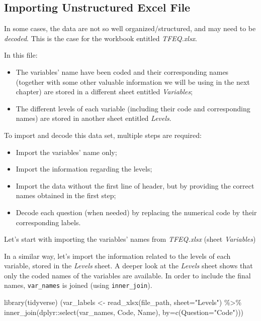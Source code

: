 \documentclass[
]{book}
\newenvironment{Shaded}{\begin{snugshade}}{\end{snugshade}}
\newcommand{\AttributeTok}[1]{\textcolor[rgb]{0.77,0.63,0.00}{#1}}
\newcommand{\FunctionTok}[1]{\textcolor[rgb]{0.00,0.00,0.00}{#1}}
\newcommand{\NormalTok}[1]{#1}
\newcommand{\OtherTok}[1]{\textcolor[rgb]{0.56,0.35,0.01}{#1}}
\newcommand{\SpecialCharTok}[1]{\textcolor[rgb]{0.00,0.00,0.00}{#1}}
\newcommand{\StringTok}[1]{\textcolor[rgb]{0.31,0.60,0.02}{#1}}
\providecommand{\tightlist}{%
  \setlength{\itemsep}{0pt}\setlength{\parskip}{0pt}}
\begin{document}
\hypertarget{importing-unstructured-excel-file}{%
\subsection{Importing Unstructured Excel File}\label{importing-unstructured-excel-file}}

In some cases, the data are not so well organized/structured, and may need to be \emph{decoded}. This is the case for the workbook entitled \emph{TFEQ.xlsx}.

In this file:

\begin{itemize}
\tightlist
\item
  The variables' name have been coded and their corresponding names (together with some other valuable information we will be using in the next chapter) are stored in a different sheet entitled \emph{Variables};
\item
  The different levels of each variable (including their code and corresponding names) are stored in another sheet entitled \emph{Levels}.
\end{itemize}

To import and decode this data set, multiple steps are required:

\begin{itemize}
\tightlist
\item
  Import the variables' name only;
\item
  Import the information regarding the levels;
\item
  Import the data without the first line of header, but by providing the correct names obtained in the first step;
\item
  Decode each question (when needed) by replacing the numerical code by their corresponding labels.
\end{itemize}

Let's start with importing the variables' names from \emph{TFEQ.xlsx} (sheet \emph{Variables})

In a similar way, let's import the information related to the levels of each variable, stored in the \emph{Levels} sheet.
A deeper look at the \emph{Levels} sheet shows that only the coded names of the variables are available. In order to include the final names, \texttt{var\_names} is joined (using \texttt{inner\_join}).

\begin{Shaded}
\begin{Highlighting}[]
\FunctionTok{library}\NormalTok{(tidyverse)}
\NormalTok{(var\_labels }\OtherTok{\textless{}{-}} \FunctionTok{read\_xlsx}\NormalTok{(file\_path, }\AttributeTok{sheet=}\StringTok{"Levels"}\NormalTok{) }\SpecialCharTok{\%\textgreater{}\%} 
  \FunctionTok{inner\_join}\NormalTok{(dplyr}\SpecialCharTok{::}\FunctionTok{select}\NormalTok{(var\_names, Code, Name), }\AttributeTok{by=}\FunctionTok{c}\NormalTok{(}\AttributeTok{Question=}\StringTok{"Code"}\NormalTok{)))}
\end{Highlighting}
\end{Shaded}
\end{document}

